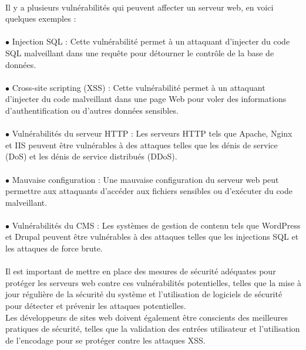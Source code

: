 \paragraph{ }
Il y a plusieurs vulnérabilités qui peuvent affecter un serveur web, en voici quelques exemples :
\paragraph{ }
$\bullet$ Injection SQL : Cette vulnérabilité permet à un attaquant d'injecter du code SQL malveillant dans une requête pour détourner le contrôle de la base de données.
\paragraph{ }
$\bullet$ Cross-site scripting (XSS) : Cette vulnérabilité permet à un attaquant d'injecter du code malveillant dans une page Web pour voler des informations d'authentification ou d'autres données sensibles.
\paragraph{ }
$\bullet$ Vulnérabilités du serveur HTTP : Les serveurs HTTP tels que Apache, Nginx et IIS peuvent être vulnérables à des attaques telles que les dénis de service (DoS) et les dénis de service distribués (DDoS).
\paragraph{ }
$\bullet$ Mauvaise configuration : Une mauvaise configuration du serveur web peut permettre aux attaquants d'accéder aux fichiers sensibles ou d'exécuter du code malveillant.
\paragraph{ }
$\bullet$ Vulnérabilités du CMS : Les systèmes de gestion de contenu tels que WordPress et Drupal peuvent être vulnérables à des attaques telles que les injections SQL et les attaques de force brute.\\
\paragraph{ }
Il est important de mettre en place des mesures de sécurité adéquates pour protéger les serveurs web contre ces vulnérabilités potentielles, telles que la mise à jour régulière de la sécurité du système et l'utilisation de logiciels de sécurité pour détecter et prévenir les attaques potentielles. \\Les développeurs de sites web doivent également être conscients des meilleures pratiques de sécurité, telles que la validation des entrées utilisateur et l'utilisation de l'encodage pour se protéger contre les attaques XSS.\\


